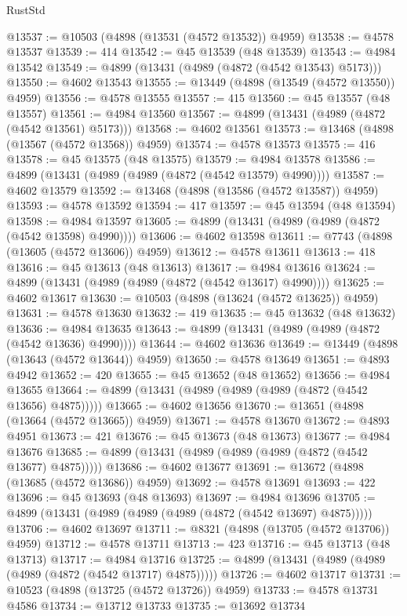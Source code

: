 \begin{lexlean}{RustStd}
\begin{coremodule}
@13537 := @10503 (@4898 (@13531 (@4572 @13532)) @4959)
@13538 := @4578 @13537
@13539 := 414
@13542 := @45 @13539 (@48 @13539)
@13543 := @4984 @13542
@13549 := @4899 (@13431 (@4989 (@4872 (@4542 @13543) @5173)))
@13550 := @4602 @13543
@13555 := @13449 (@4898 (@13549 (@4572 @13550)) @4959)
@13556 := @4578 @13555
@13557 := 415
@13560 := @45 @13557 (@48 @13557)
@13561 := @4984 @13560
@13567 := @4899 (@13431 (@4989 (@4872 (@4542 @13561) @5173)))
@13568 := @4602 @13561
@13573 := @13468 (@4898 (@13567 (@4572 @13568)) @4959)
@13574 := @4578 @13573
@13575 := 416
@13578 := @45 @13575 (@48 @13575)
@13579 := @4984 @13578
@13586 := @4899 (@13431 (@4989 (@4989 (@4872 (@4542 @13579) @4990))))
@13587 := @4602 @13579
@13592 := @13468 (@4898 (@13586 (@4572 @13587)) @4959)
@13593 := @4578 @13592
@13594 := 417
@13597 := @45 @13594 (@48 @13594)
@13598 := @4984 @13597
@13605 := @4899 (@13431 (@4989 (@4989 (@4872 (@4542 @13598) @4990))))
@13606 := @4602 @13598
@13611 := @7743 (@4898 (@13605 (@4572 @13606)) @4959)
@13612 := @4578 @13611
@13613 := 418
@13616 := @45 @13613 (@48 @13613)
@13617 := @4984 @13616
@13624 := @4899 (@13431 (@4989 (@4989 (@4872 (@4542 @13617) @4990))))
@13625 := @4602 @13617
@13630 := @10503 (@4898 (@13624 (@4572 @13625)) @4959)
@13631 := @4578 @13630
@13632 := 419
@13635 := @45 @13632 (@48 @13632)
@13636 := @4984 @13635
@13643 := @4899 (@13431 (@4989 (@4989 (@4872 (@4542 @13636) @4990))))
@13644 := @4602 @13636
@13649 := @13449 (@4898 (@13643 (@4572 @13644)) @4959)
@13650 := @4578 @13649
@13651 := @4893 @4942
@13652 := 420
@13655 := @45 @13652 (@48 @13652)
@13656 := @4984 @13655
@13664 := @4899 (@13431 (@4989 (@4989 (@4989 (@4872 (@4542 @13656) @4875)))))
@13665 := @4602 @13656
@13670 := @13651 (@4898 (@13664 (@4572 @13665)) @4959)
@13671 := @4578 @13670
@13672 := @4893 @4951
@13673 := 421
@13676 := @45 @13673 (@48 @13673)
@13677 := @4984 @13676
@13685 := @4899 (@13431 (@4989 (@4989 (@4989 (@4872 (@4542 @13677) @4875)))))
@13686 := @4602 @13677
@13691 := @13672 (@4898 (@13685 (@4572 @13686)) @4959)
@13692 := @4578 @13691
@13693 := 422
@13696 := @45 @13693 (@48 @13693)
@13697 := @4984 @13696
@13705 := @4899 (@13431 (@4989 (@4989 (@4989 (@4872 (@4542 @13697) @4875)))))
@13706 := @4602 @13697
@13711 := @8321 (@4898 (@13705 (@4572 @13706)) @4959)
@13712 := @4578 @13711
@13713 := 423
@13716 := @45 @13713 (@48 @13713)
@13717 := @4984 @13716
@13725 := @4899 (@13431 (@4989 (@4989 (@4989 (@4872 (@4542 @13717) @4875)))))
@13726 := @4602 @13717
@13731 := @10523 (@4898 (@13725 (@4572 @13726)) @4959)
@13733 := @4578 @13731 @4586
@13734 := @13712 @13733
@13735 := @13692 @13734

\end{coremodule}
\end{lexlean}
